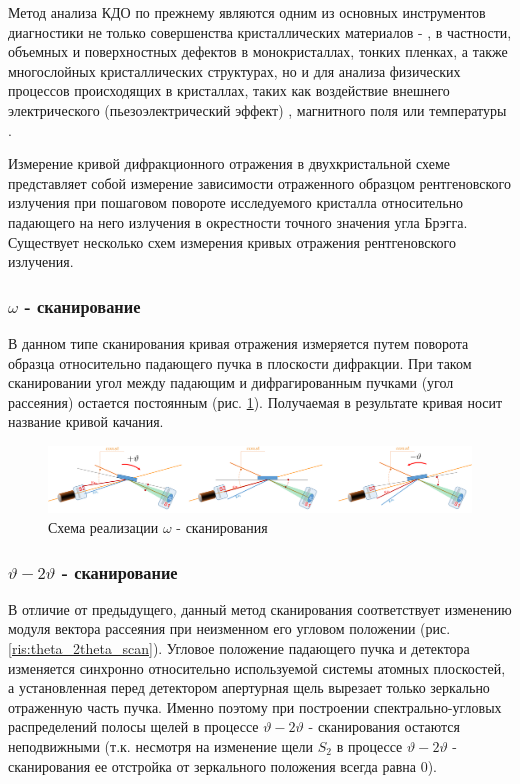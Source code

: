 Метод анализа КДО по прежнему являются одним из основных инструментов диагностики не только совершенства
кристаллических материалов \cite{sov_1} - \cite{sov_5}, в частности, объемных и поверхностных дефектов в
монокристаллах, тонких пленках, а также многослойных кристаллических структурах, но и для анализа физических
процессов происходящих в кристаллах, таких как воздействие внешнего электрического (пьезоэлектрический эффект) \cite{piezo102},
магнитного поля или температуры \cite{temp}.

Измерение кривой дифракционного отражения в двухкристальной схеме представляет
собой измерение зависимости отраженного образцом рентгеновского излучения при
пошаговом повороте исследуемого кристалла относительно падающего на него
излучения в окрестности точного значения угла Брэгга.
Существует несколько схем измерения кривых отражения рентгеновского излучения.

\subsubsection*{$\omega$ - сканирование}
В данном типе сканирования кривая отражения измеряется путем поворота образца
относительно падающего пучка в плоскости дифракции. При таком сканировании
угол между падающим и дифрагированным пучками (угол рассеяния) остается постоянным
(рис. \ref{ris:omega_scan}). Получаемая в результате кривая носит название кривой качания.


\begin{figure}[H]
  \centering
  \includegraphics[width=1\textwidth]{images/omega_scan.png}
  \caption{Схема реализации $\omega $ - сканирования}
  \label{ris:omega_scan}
\end{figure}

\subsubsection*{$\vartheta - 2\vartheta$ - сканирование}
В отличие от предыдущего, данный метод сканирования соответствует изменению
 модуля вектора рассеяния при неизменном его угловом положении
 (рис. \ref{ris:theta_2theta_scan}). Угловое положение падающего пучка и
 детектора изменяется синхронно относительно используемой системы
 атомных плоскостей, а установленная перед детектором апертурная щель вырезает
  только зеркально отраженную часть пучка. Именно поэтому при построении
  спектрально-угловых распределений полосы щелей в процессе $\vartheta - 2\vartheta$
  - сканирования остаются неподвижными (т.к. несмотря на изменение щели  $S_2$ в процессе
    $\vartheta - 2\vartheta$ -  сканирования ее отстройка от зеркального
    положения всегда равна 0).

